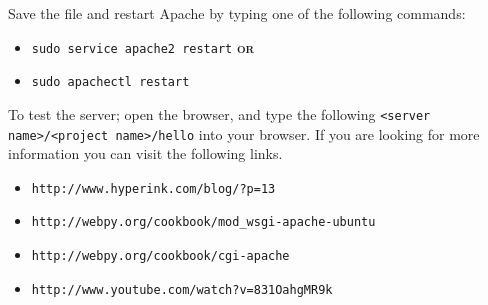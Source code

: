 \documentclass{article}
\begin{document}
Save the file and restart Apache by typing one of the following commands:
\begin{itemize}
\item \verb#sudo service apache2 restart# \textbf{\textsc{or}}
\item \verb#sudo apachectl restart#
\end{itemize}
To test the server; open the browser, and type the following \verb#<server name>/<project name>/hello# into your browser.
If you are looking for more information you can visit the following links.
\begin{itemize}
\item \verb#http://www.hyperink.com/blog/?p=13#
\item \verb#http://webpy.org/cookbook/mod_wsgi-apache-ubuntu#
\item \verb#http://webpy.org/cookbook/cgi-apache#
\item \verb#http://www.youtube.com/watch?v=831OahgMR9k#
\end{itemize}
\end{document}
